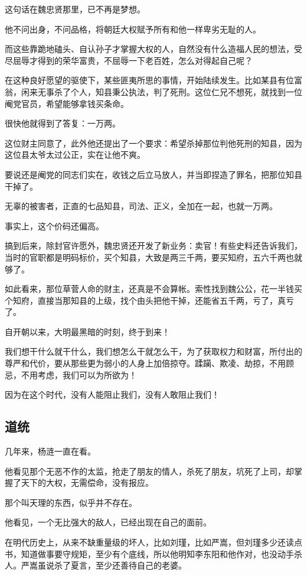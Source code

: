 \begin{multicols}{\theparacolNo}
		这句话在魏忠贤那里，已不再是梦想。

		他不问出身，不问品格，将朝廷大权赋予所有和他一样卑劣无耻的人。

		而这些靠跪地磕头、自认孙子才掌握大权的人，自然没有什么造福人民的想法，受尽屈辱才得到的荣华富贵，不屈辱一下老百姓，怎么对得起自己呢？

		在这种良好愿望的驱使下，某些匪夷所思的事情，开始陆续发生。比如某县有位富翁，闲来无事杀了个人，知县秉公执法，判了死刑。这位仁兄不想死，就找到一位阉党官员，希望能够拿钱买条命。

		很快他就得到了答复：一万两。

		这位财主同意了，此外他还提出了一个要求：希望杀掉那位判他死刑的知县，因为这位县太爷太过公正，实在让他不爽。

		要说还是阉党的同志们实在，收钱之后立马放人，并当即捏造了罪名，把那位知县干掉了。

		无辜的被害者，正直的七品知县，司法、正义，全加在一起，也就一万两。

		事实上，这个价码还偏高。

		搞到后来，除封官许愿外，魏忠贤还开发了新业务：卖官！有些史料还告诉我们，当时的官职都是明码标价，买个知县，大致是两三千两，要买知府，五六千两也就够了。

		如此看来，那位草菅人命的财主，还真是不会算帐。索性找到魏公公，花一半钱买个知府，直接当那知县的上级，找个由头把他干掉，还能省五千两，亏了，真亏了。

		自开朝以来，大明最黑暗的时刻，终于到来！

		我们想干什么就干什么，我们想怎么干就怎么干，为了获取权力和财富，所付出的尊严和代价，要从那些更为弱小的人身上加倍掠夺。蹂躏、欺凌、劫掠，不用顾忌，不用考虑，我们可以为所欲为！

		因为在这个时代，没有人能阻止我们，没有人敢阻止我们！

		\subsection{道统}
		几年来，杨涟一直在看。

		他看见那个无恶不作的太监，抢走了朋友的情人，杀死了朋友，坑死了上司，却掌握了天下的大权，无需偿命，没有报应。

		那个叫天理的东西，似乎并不存在。

		他看见，一个无比强大的敌人，已经出现在自己的面前。

		在明代历史上，从来不缺重量级的坏人，比如刘瑾，比如严嵩，但刘瑾多少还读点书，知道做事要守规矩，至少有个底线，所以他明知李东阳和他作对，也没动手杀人。严嵩虽说杀了夏言，至少还善待自己的老婆。


\end{multicols}
